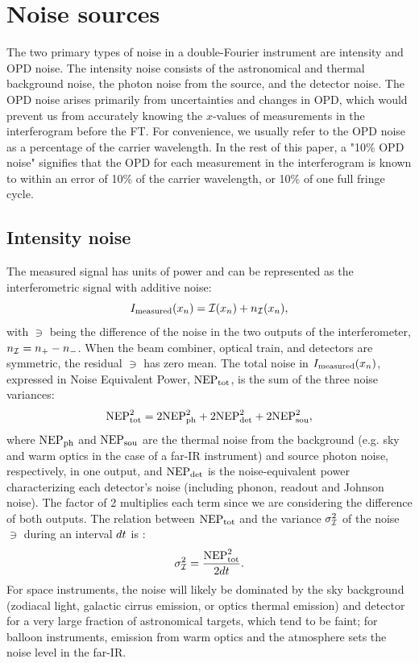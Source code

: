 \section{Noise sources}
The two primary types of noise in a double-Fourier instrument are intensity and OPD noise. The intensity
noise consists of the astronomical and thermal background noise, the photon noise from the source, and the detector noise. The OPD noise arises primarily from uncertainties and changes in OPD, which would prevent us from accurately knowing the $x$-values of measurements in the interferogram before the FT. For convenience, we usually refer to the OPD noise as a percentage of the carrier wavelength. In the rest of this paper, a "10\% OPD noise" signifies that the OPD for each measurement in the interferogram is known to within an error of 10\% of the carrier wavelength, or 10\% of one full fringe cycle.

\subsection{Intensity noise}
\label{sec:noisesource}
The measured signal has units of power and can be represented as the interferometric signal with additive noise:
\begin{equation}
I_\textrm{measured}(x_n) = \mathcal{I}(x_n) + n_{\mathcal{I}}(x_n),
\label{eq:thermalnoise}
\end{equation}
with $\ni$ being the difference of the noise in the two outputs of the interferometer, $n_{\mathcal{I}} = n_+-n_-$. When the beam combiner, optical train, and detectors are symmetric, the residual $\ni$ has zero mean. 
The total noise in $I_\textrm{measured}(x_n)$, expressed in Noise Equivalent Power, $\textrm{NEP}_\textrm{tot}$, is the sum of the three noise variances: 
\begin{equation}
\textrm{NEP}_\textrm{tot}^2 = 2\textrm{NEP}_\textrm{ph}^2 +2\textrm{NEP}_\textrm{det}^2 +  2\textrm{NEP}_\textrm{sou}^2,
\end{equation}
where $\textrm{NEP}_\textrm{ph}$ and $\textrm{NEP}_\textrm{sou}$ are the thermal noise from the background (e.g. sky and warm optics in the case of a far-IR instrument)
and source photon noise, respectively, in one output, and $\textrm{NEP}_\textrm{det}$ is the noise-equivalent power characterizing each detector's noise (including phonon, readout and Johnson noise). The factor of 2 multiplies each term since we are considering the difference of both outputs.
The relation between $\textrm{NEP}_\textrm{tot}$ and the variance $\sigma_{\mathcal{I}}^2$ of the noise $\ni$ during an interval $dt$ is \citep{Sromovsky:2003in}:
\begin{equation}
\label{eq:sigI}
\sigma_{\mathcal{I}}^2 = \frac{\textrm{NEP}_\textrm{tot}^2}{2dt}.
\end{equation}
For space instruments, the noise will likely be dominated by the sky background (zodiacal light, galactic cirrus emission, or optics thermal emission) and detector for a very large fraction of astronomical targets, which tend to be faint; for balloon instruments, emission from
warm optics and the atmosphere sets the noise level in the far-IR.

